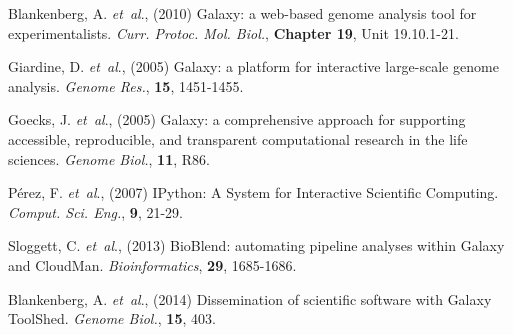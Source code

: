 \documentclass{bioinfo}
\begin{document}

%
%
%
%
%
%
%
%


\begin{thebibliography}{}
Blankenberg, A. {\it et~al}., (2010) Galaxy: a web-based genome analysis tool for experimentalists. \textit{Curr. Protoc. Mol. Biol.},  {\bf Chapter 19}, Unit 19.10.1-21.

Giardine, D. {\it et~al}., (2005) Galaxy: a platform for interactive large-scale genome analysis. \textit{Genome Res.},  {\bf 15}, 1451-1455.

Goecks, J. {\it et~al}., (2005) Galaxy: a comprehensive approach for supporting accessible, reproducible, and transparent computational research in the life sciences. \textit{Genome Biol.},  {\bf 11}, R86.

P\'erez, F. {\it et~al}., (2007) IPython: A System for Interactive Scientific Computing. \textit{Comput. Sci. Eng.}, {\bf 9}, 21-29.

Sloggett, C. {\it et~al}., (2013) BioBlend: automating pipeline analyses within Galaxy and CloudMan. \textit{Bioinformatics}, {\bf 29}, 1685-1686.

Blankenberg, A. {\it et~al}., (2014) Dissemination of scientific software with Galaxy ToolShed. \textit{Genome Biol.}, {\bf 15}, 403.



\end{thebibliography}
\end{document}
